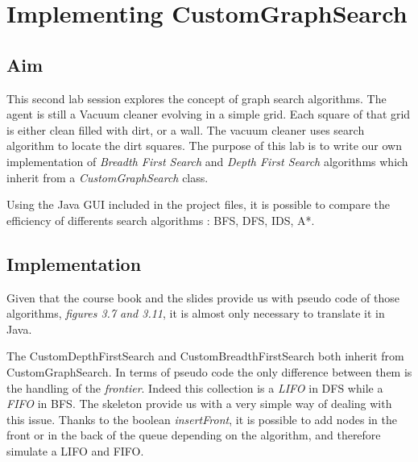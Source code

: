   \section{Implementing CustomGraphSearch}
 \thispagestyle{empty}
\subsection{Aim}

This second lab session explores the concept of graph search algorithms. The
agent is still a Vacuum cleaner evolving in a simple grid.
Each square of that grid is either clean filled with dirt, or a wall.
The vacuum cleaner uses search algorithm to locate the dirt squares.
The purpose of this lab is to write our own implementation of
\textit{Breadth First Search} and \textit{Depth First Search} algorithms which
inherit from a \textit{CustomGraphSearch} class.

Using the Java GUI included in the project files, it is possible to compare the
efficiency of differents search algorithms : BFS, DFS, IDS, A*.


\subsection{Implementation}

Given that the course book and the slides provide us with pseudo code of those
algorithms, \textit{figures 3.7 and 3.11}, it is almost only necessary to translate it in Java.

The CustomDepthFirstSearch and CustomBreadthFirstSearch both inherit from
CustomGraphSearch. In terms of pseudo code the only difference between
them is the handling of the \textit{frontier}. Indeed this collection is a
\textit{LIFO} in DFS while a \textit{FIFO} in BFS. The skeleton provide us with
a very simple way of dealing with this issue. Thanks to the boolean \textit{insertFront},
it is possible to add nodes in the front or in the back of the queue depending
on the algorithm, and therefore simulate a LIFO and FIFO.

